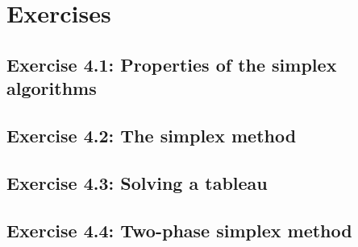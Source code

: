 
 \vfill
\pagebreak
\section{Exercises}

\subsection*{Exercise 4.1: Properties of the simplex algorithms}


\subsection*{Exercise 4.2: The simplex method}


\subsection*{Exercise 4.3: Solving a tableau}


\subsection*{Exercise 4.4: Two-phase simplex method}





